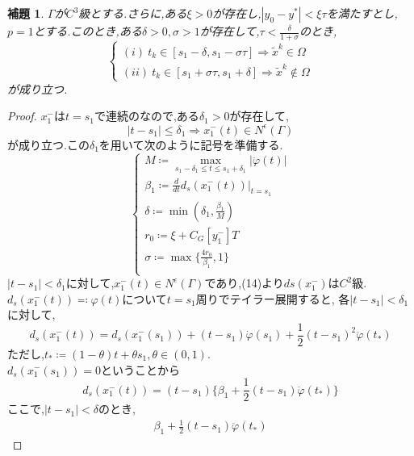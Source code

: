 \documentclass[a4,12pt]{article}
\newtheorem{lem}{補題}
\begin{document}
\begin{lem}
\label{dom}
$\Gamma$が$C^3$級とする.さらに,ある$\xi>0$が存在し,$|y_0-y^\ast|<\xi\tau$を満たすとし,$p=1$とする.このとき,ある$\delta>0,\sigma>1$が存在して,$\tau<\frac{\delta}{1+\sigma}$のとき,
\begin{equation}
    \begin{cases}
        (i)\ t_k\in [s_1-\delta,s_1-\sigma\tau ] \Rightarrow \tilde{x}^k\in\Omega\\
        (ii)\ t_k\in [s_1+\sigma\tau, s_1+\delta ] \Rightarrow \tilde{x}^k\notin\Omega
    \end{cases}
\end{equation}
が成り立つ.\\
\end{lem}
\begin{proof}
    $x^-_1$は$t=s_1$で連続のなので,ある$\delta_1>0$が存在して,
    \begin{equation}
        |t-s_1|\leq\delta_1\Rightarrow x^{-}_1(t)\in N^\epsilon(\Gamma)
    \end{equation}
が成り立つ.この$\delta_1$を用いて次のように記号を準備する.
\begin{equation}\begin{cases}
    M\coloneqq \underset{s_1-\delta_1\le t\le s_1+\delta_1}{\max}|\ddot{\varphi}(t)|\\
    \beta_1\coloneqq \frac{d}{dt}d_s(x^-_1(t))|_{t=s_1}\\
    \delta\coloneqq \min(\delta_1,\frac{\beta_1}{M})\\
    r_0\coloneqq \xi + C_G[y^-_1]T\\
    \sigma\coloneqq \max\{\frac{4r_0}{\beta_1},1\}\\
\end{cases}\end{equation}
    $|t-s_1|<\delta_1$に対して,$x^-_1(t)\in N^\epsilon(\Gamma)$であり,(14)より$ds(x^-_1)$は$C^2$級.\\$d_s(x^{-}_1(t))\eqqcolon\varphi(t)$について$t=s_1$周りでテイラー展開すると,
    各$|t-s_1|<\delta_1$に対して,
    \[d_s(x^{-}_1(t))=d_s(x^{-}_1(s_1))+(t-s_1)\dot{\varphi}(s_1)+\frac{1}{2}(t-s_1)^2\ddot{\varphi}(t_\ast)\]   
ただし,$t_\ast\coloneqq (1-\theta)t+\theta s_1,\theta\in(0,1)$.\\
    $d_s(x^{-}_1(s_1))=0$ということから
    \[
        d_s(x^{-}_1(t))=(t-s_1)\{\beta_1+\frac{1}{2}(t-s_1)\ddot{\varphi}(t_\ast)\}
    \]
ここで,$|t-s_1|<\delta$のとき,
\begin{align*}
    \beta_1+\frac{1}{2}(t-s_1)\ddot{\varphi}(t_\ast)

\end{align*}
\end{proof}
\end{document}
